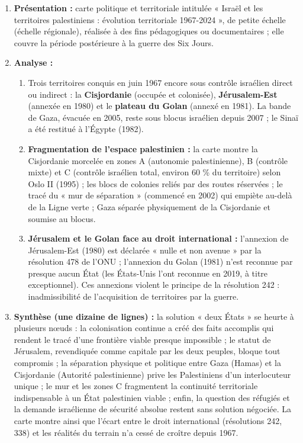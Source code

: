 \documentclass[11pt]{article}
\begin{document}
\begin{corrige}
\begin{enumerate}
    \item \textbf{Présentation :} carte politique et territoriale intitulée « Israël et les territoires palestiniens : évolution territoriale 1967-2024 », de petite échelle (échelle régionale), réalisée à des fins pédagogiques ou documentaires ; elle couvre la période postérieure à la guerre des Six Jours.
    \item \textbf{Analyse :}
    \begin{enumerate}
        \item Trois territoires conquis en juin 1967 encore sous contrôle israélien direct ou indirect : la \textbf{Cisjordanie} (occupée et colonisée), \textbf{Jérusalem-Est} (annexée en 1980) et le \textbf{plateau du Golan} (annexé en 1981). La bande de Gaza, évacuée en 2005, reste sous blocus israélien depuis 2007 ; le Sinaï a été restitué à l'Égypte (1982).
        \item \textbf{Fragmentation de l'espace palestinien :} la carte montre la Cisjordanie morcelée en zones A (autonomie palestinienne), B (contrôle mixte) et C (contrôle israélien total, environ 60 \% du territoire) selon Oslo II (1995) ; les blocs de colonies reliés par des routes réservées ; le tracé du « mur de séparation » (commencé en 2002) qui empiète au-delà de la Ligne verte ; Gaza séparée physiquement de la Cisjordanie et soumise au blocus.
        \item \textbf{Jérusalem et le Golan face au droit international :} l'annexion de Jérusalem-Est (1980) est déclarée « nulle et non avenue » par la résolution 478 de l'ONU ; l'annexion du Golan (1981) n'est reconnue par presque aucun État (les États-Unis l'ont reconnue en 2019, à titre exceptionnel). Ces annexions violent le principe de la résolution 242 : inadmissibilité de l'acquisition de territoires par la guerre.
    \end{enumerate}
    \item \textbf{Synthèse (une dizaine de lignes) :} la solution « deux États » se heurte à plusieurs nœuds : la colonisation continue a créé des faits accomplis qui rendent le tracé d'une frontière viable presque impossible ; le statut de Jérusalem, revendiquée comme capitale par les deux peuples, bloque tout compromis ; la séparation physique et politique entre Gaza (Hamas) et la Cisjordanie (Autorité palestinienne) prive les Palestiniens d'un interlocuteur unique ; le mur et les zones C fragmentent la continuité territoriale indispensable à un État palestinien viable ; enfin, la question des réfugiés et la demande israélienne de sécurité absolue restent sans solution négociée. La carte montre ainsi que l'écart entre le droit international (résolutions 242, 338) et les réalités du terrain n'a cessé de croître depuis 1967.

\end{enumerate}
\end{corrige}
\end{document}
